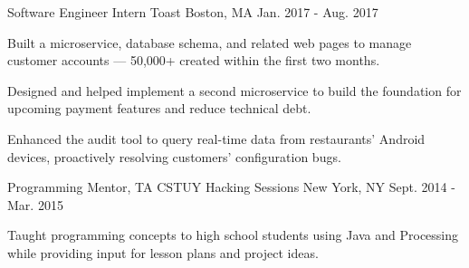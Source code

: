 \begin{cventries}
  \cventry
    {Software Engineer Intern} %
    {Toast} %
    {Boston, MA} %
    {Jan. 2017 - Aug. 2017} %
    {
      \begin{cvitems} %
        \item {Built a microservice, database schema, and related web pages to manage customer accounts --- 50,000+ created within the first two months.}
		\item {Designed and helped implement a second microservice to build the foundation for upcoming payment features and reduce technical debt.}
		\item {Enhanced the audit tool to query real-time data from restaurants' Android devices, proactively resolving customers' configuration bugs.}
      \end{cvitems}
    }

  \cventry
    {Programming Mentor, TA} %
    {CSTUY Hacking Sessions} %
    {New York, NY} %
    {Sept. 2014 - Mar. 2015} %
    {
      \begin{cvitems} %
        \item {Taught programming concepts to high school students using Java and Processing while providing input for lesson plans and project ideas.}
      \end{cvitems}
    }    
\end{cventries}
